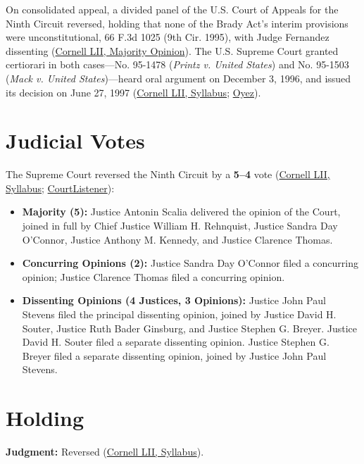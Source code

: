 \documentclass[12pt]{article}
\begin{document}
On consolidated appeal, a divided panel of the U.S. Court of Appeals for the Ninth Circuit reversed, holding that none of the Brady Act's interim provisions were unconstitutional, 66 F.3d 1025 (9th Cir. 1995), with Judge Fernandez dissenting (\href{https://www.law.cornell.edu/supct/html/95-1478.ZO.html}{Cornell LII, Majority Opinion}). The U.S. Supreme Court granted certiorari in both cases---No. 95-1478 (\textit{Printz v. United States}) and No. 95-1503 (\textit{Mack v. United States})---heard oral argument on December 3, 1996, and issued its decision on June 27, 1997 (\href{https://www.law.cornell.edu/supct/html/95-1478.ZS.html}{Cornell LII, Syllabus}; \href{https://www.oyez.org/cases/1996/95-1478}{Oyez}).

\section{Judicial Votes}
The Supreme Court reversed the Ninth Circuit by a \textbf{5--4} vote (\href{https://www.law.cornell.edu/supct/html/95-1478.ZS.html}{Cornell LII, Syllabus}; \href{https://www.courtlistener.com/opinion/118148/printz-v-united-states/}{CourtListener}):
\begin{itemize}
\item \textbf{Majority (5):} Justice Antonin Scalia delivered the opinion of the Court, joined in full by Chief Justice William H. Rehnquist, Justice Sandra Day O'Connor, Justice Anthony M. Kennedy, and Justice Clarence Thomas.
\item \textbf{Concurring Opinions (2):} Justice Sandra Day O'Connor filed a concurring opinion; Justice Clarence Thomas filed a concurring opinion.
\item \textbf{Dissenting Opinions (4 Justices, 3 Opinions):} Justice John Paul Stevens filed the principal dissenting opinion, joined by Justice David H. Souter, Justice Ruth Bader Ginsburg, and Justice Stephen G. Breyer. Justice David H. Souter filed a separate dissenting opinion. Justice Stephen G. Breyer filed a separate dissenting opinion, joined by Justice John Paul Stevens.
\end{itemize}

\section{Holding}
\textbf{Judgment:} Reversed (\href{https://www.law.cornell.edu/supct/html/95-1478.ZS.html}{Cornell LII, Syllabus}).
\end{document}
